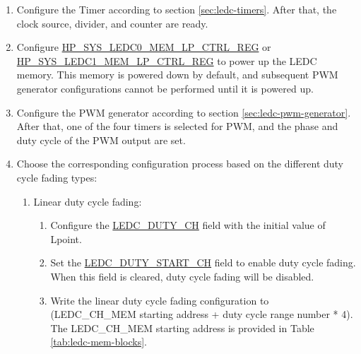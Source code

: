 \documentclass[main\_\_EN.tex]{subfiles}
\begin{document}
\begin{enumerate}
\begin{enumerate}
            \item Enable LEDC0\_CLK by setting the \hyperref[fielddesc:HPSYSCLKRSTLEDC0CLKEN]{HP\_SYS\_CLKRST\_LEDC0\_CLK\_EN} field to 1; or enable LEDC1\_CLK by setting the \hyperref[fielddesc:HPSYSCLKRSTLEDC1CLKEN]{HP\_SYS\_CLKRST\_LEDC1\_CLK\_EN} field to 1.
        \end{enumerate}
    \item Configure the Timer according to section \ref{sec:ledc-timers}. After that, the clock source, divider, and counter are ready.
    \item Configure \hyperref[regdesc:HPSYSLEDC0MEMLPCTRLREG]{HP\_SYS\_LEDC0\_MEM\_LP\_CTRL\_REG} or \hyperref[regdesc:HPSYSLEDC1MEMLPCTRLREG]{HP\_SYS\_LEDC1\_MEM\_LP\_CTRL\_REG} to power up the LEDC memory. This memory is powered down by default, and subsequent PWM generator configurations cannot be performed until it is powered up.
    \item Configure the PWM generator according to section \ref{sec:ledc-pwm-generator}. After that, one of the four timers is selected for PWM, and the phase and duty cycle of the PWM output are set.
    \item Choose the corresponding configuration process based on the different duty cycle fading types:
    \begin{enumerate}
        \item Linear duty cycle fading:
            \begin{enumerate}
                \item Configure the \hyperref[fielddesc:LEDCDUTYCHN]{LEDC\_DUTY\_CH} field with the initial value of Lpoint.
                \item Set the \hyperref[fielddesc:LEDCDUTYSTARTCHN]{LEDC\_DUTY\_START\_CH} field to enable duty cycle fading. When this field is cleared, duty cycle fading will be disabled.
                \item Write the linear duty cycle fading configuration to (LEDC\_CH\_MEM starting address + duty cycle range number * 4). The LEDC\_CH\_MEM starting address is provided in Table \ref{tab:ledc-mem-blocks}. \\


\end{enumerate}
\end{enumerate}
\end{enumerate}
\end{document}
